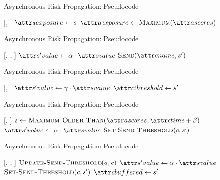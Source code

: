 \documentclass[11pt]{beamer}
\begin{document}
\begin{frame}{Asynchronous Risk Propagation: Pseudocode}
\begin{function}{\nUpdateExposureScore}[\vActor, \vScore]
  \If{$\aActorExposureValue < \aScoreValue$}
    \State $\aActorExposure \assign \vScore$
    \State $\aActorExposure \assign \cMaximum[\aActorScores]$
  \EndIf
\end{function}
\end{frame}

\begin{frame}{Asynchronous Risk Propagation: Pseudocode}
\begin{function}{\nApplyRiskScore}[\vActor, \vContact, \vScore]
  \If{$\aContactTime + \pTimeBuffer > \aScoreTime$}
    \State $\aNewScoreValue \assign \pTransmissionRate \cdot \aScoreValue$
    \State $\cSend[\aContactName, \vNewScore]$
  \EndIf
\end{function}
\end{frame}

\begin{frame}{Asynchronous Risk Propagation: Pseudocode}
\begin{function}{\nSetSendThreshold}[\vContact, \vScore]
  \State $\aNewScoreValue \assign \pSendCoefficient \cdot \aScoreValue$
  \State $\aContactThreshold \assign \vNewScore$
\end{function}
\end{frame}

\begin{frame}{Asynchronous Risk Propagation: Pseudocode}
\begin{function}{\nUpdateSendThreshold}[\vActor, \vContact]
      \State $\vScore \assign \cMaximumOlderThan[\aActorScores, \aContactTime + \pTimeBuffer]$
      \State $\aNewScoreValue \assign \pTransmissionRate \cdot \aScoreValue$
      \State $\cSetSendThreshold[\vContact, \vNewScore]$
    \EndIf
  \EndIf
\end{function}
\end{frame}

\begin{frame}{Asynchronous Risk Propagation: Pseudocode}
\begin{function}{\nApplyRiskScore}[\vActor, \vContact, \vScore]
  \State $\cUpdateSendThreshold[\vActor, \vContact]$
  \If{$\aContactThresholdValue < \aScoreValue \AND \aContactTime + \pTimeBuffer > \aScoreTime$}
    \State $\aNewScoreValue \assign \pTransmissionRate \cdot \aScoreValue$
    \State $\cSetSendThreshold[\vContact, \vNewScore]$
    \State $\aContactBuffered \assign \vNewScore$
  \EndIf
\end{function}
\end{frame}
\end{document}
